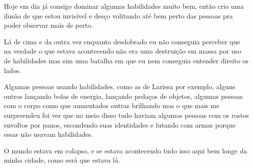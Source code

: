 Hoje em dia já consigo dominar algumas habilidades muito bem, então crio uma ilusão de que estou invisível e desço volitando até bem perto das pessoas pra poder observar mais de perto.

Lá de cima e da outra vez enquanto desdobrado eu não conseguia perceber que na verdade o que estava acontecendo não era uma destruição em massa por uso de habilidades mas sim uma batalha em que eu nem conseguia entender direito os lados.

Algumas pessoas usando habilidades, como as de Larissa por exemplo, alguns outros lançando bolas de energia, lançando pedaços de objetos, algumas pessoas com o corpo como que aumentados outras brilhando mas o que mais me surpreendeu foi ver que no meio disso tudo haviam algumas pessoas com os rostos envoltos por panos, escondendo suas identidades e lutando com armas porque essas não usavam habilidades.

O mundo estava em colapso, e se estava acontecendo tudo isso aqui bem longe da minha cidade, como será que estava lá.